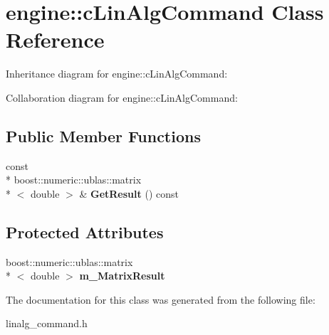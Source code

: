 \hypertarget{classengine_1_1cLinAlgCommand}{\section{engine\-:\-:c\-Lin\-Alg\-Command Class Reference}
\label{classengine_1_1cLinAlgCommand}
}


Inheritance diagram for engine\-:\-:c\-Lin\-Alg\-Command\-:


Collaboration diagram for engine\-:\-:c\-Lin\-Alg\-Command\-:
\subsection*{Public Member Functions}
\begin{DoxyCompactItemize}
\item 
\hypertarget{classengine_1_1cLinAlgCommand_a3dbae2cc51f034f34c6576a9f1778d5f}{const \\*
boost\-::numeric\-::ublas\-::matrix\\*
$<$ double $>$ \& {\bfseries Get\-Result} () const }\label{classengine_1_1cLinAlgCommand_a3dbae2cc51f034f34c6576a9f1778d5f}

\end{DoxyCompactItemize}
\subsection*{Protected Attributes}
\begin{DoxyCompactItemize}
\item 
\hypertarget{classengine_1_1cLinAlgCommand_a4475514733c3b2344e74b32881d8fcc9}{boost\-::numeric\-::ublas\-::matrix\\*
$<$ double $>$ {\bfseries m\-\_\-\-Matrix\-Result}}\label{classengine_1_1cLinAlgCommand_a4475514733c3b2344e74b32881d8fcc9}

\end{DoxyCompactItemize}


The documentation for this class was generated from the following file\-:\begin{DoxyCompactItemize}
\item 
linalg\-\_\-command.\-h\end{DoxyCompactItemize}
